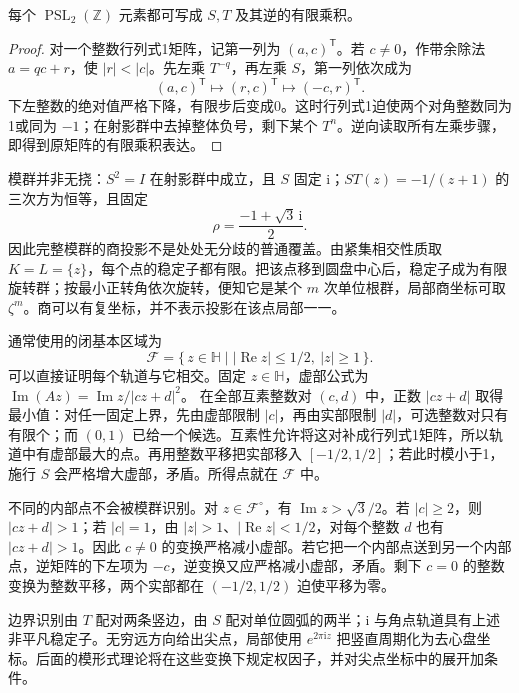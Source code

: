 \begin{proposition}[模群的生成元]\label{b3:prop:11-modular-generators}
每个 \(\operatorname{PSL}_2(\mathbb Z)\) 元素都可写成 \(S,T\) 及其逆的有限乘积。
\end{proposition}
\begin{proof}
对一个整数行列式1矩阵，记第一列为 \((a,c)^{\mathsf T}\)。若 \(c\ne0\)，作带余除法 \(a=qc+r\)，使 \(|r|<|c|\)。先左乘 \(T^{-q}\)，再左乘 \(S\)，第一列依次成为
\[
 (a,c)^{\mathsf T}\longmapsto(r,c)^{\mathsf T}
 \longmapsto(-c,r)^{\mathsf T}.
\]
下左整数的绝对值严格下降，有限步后变成0。这时行列式1迫使两个对角整数同为1或同为 \(-1\)；在射影群中去掉整体负号，剩下某个 \(T^n\)。逆向读取所有左乘步骤，即得到原矩阵的有限乘积表达。
\end{proof}
模群并非无挠：\(S^2=I\) 在射影群中成立，且 \(S\) 固定 \(\mathrm{i}\)；\(ST(z)=-1/(z+1)\) 的三次方为恒等，且固定
\[
 \rho=\frac{-1+\sqrt3\,\mathrm{i}}2.
\]
因此完整模群的商投影不是处处无分歧的普通覆盖。由紧集相交性质取 \(K=L=\{z\}\)，每个点的稳定子都有限。把该点移到圆盘中心后，稳定子成为有限旋转群；按最小正转角依次旋转，便知它是某个 \(m\) 次单位根群，局部商坐标可取 \(\zeta^m\)。商可以有复坐标，并不表示投影在该点局部一一。

\ProseParagraphBreak
通常使用的闭基本区域为
\[
 \mathcal F=\{\,z\in\mathbb H\mid
               |\operatorname{Re}z|\le1/2,\ |z|\ge1\,\}.
\]
可以直接证明每个轨道与它相交。固定 \(z\in\mathbb H\)，虚部公式为
\(\operatorname{Im}(Az)=\operatorname{Im}z/|cz+d|^2\)。
在全部互素整数对 \((c,d)\) 中，正数 \(|cz+d|\) 取得最小值：对任一固定上界，先由虚部限制 \(|c|\)，再由实部限制 \(|d|\)，可选整数对只有有限个；而 \((0,1)\) 已给一个候选。互素性允许将这对补成行列式1矩阵，所以轨道中有虚部最大的点。再用整数平移把实部移入 \([-1/2,1/2]\)；若此时模小于1，施行 \(S\) 会严格增大虚部，矛盾。所得点就在 \(\mathcal F\) 中。

\ProseParagraphBreak
不同的内部点不会被模群识别。对 \(z\in\mathcal F^\circ\)，有 \(\operatorname{Im}z>\sqrt3/2\)。若 \(|c|\ge2\)，则 \(|cz+d|>1\)；若 \(|c|=1\)，由 \(|z|>1\)、\(|\operatorname{Re}z|<1/2\)，对每个整数 \(d\) 也有 \(|cz+d|>1\)。因此 \(c\ne0\) 的变换严格减小虚部。若它把一个内部点送到另一个内部点，逆矩阵的下左项为 \(-c\)，逆变换又应严格减小虚部，矛盾。剩下 \(c=0\) 的整数变换为整数平移，两个实部都在 \((-1/2,1/2)\) 迫使平移为零。

\ProseParagraphBreak
边界识别由 \(T\) 配对两条竖边，由 \(S\) 配对单位圆弧的两半；\(\mathrm{i}\) 与角点轨道具有上述非平凡稳定子。无穷远方向给出尖点，局部使用 \(e^{2\pi\mathrm{i}z}\) 把竖直周期化为去心盘坐标。后面的模形式理论将在这些变换下规定权因子，并对尖点坐标中的展开加条件。
